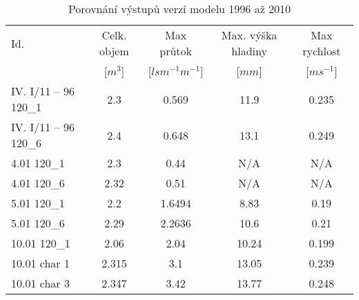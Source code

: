 \begin{table}[htbp]
  \centering
  \caption{Porovnání výstupů verzí modelu 1996 až 2010}
    \begin{tabular}{lcccc}
    \hline   \hline 
      Id.    & Celk. objem & Max průtok & Max. výška hladiny & Max rychlost \\
          & [$m^{3}$]  & [$lsm^{-1}m^{-1}$] & [$mm$]  & [$ms^{-1}$] \\
    \hline
%   
    IV. I/11 – 96 120\_1 & 2.3   & 0.569 & 11.9  & 0.235 \\

    IV. I/11 – 96 120\_6 & 2.4   & 0.648 & 13.1  & 0.249 \\

    4.01 120\_1 & 2.3   & 0.44  &  N/A    &  N/A\\

    4.01 120\_6 & 2.32  & 0.51  &  N/A     &  N/A\\

    5.01 120\_1 & 2.2   & 1.6494 & 8.83  & 0.19 \\

    5.01 120\_6 & 2.29  & 2.2636 & 10.6  & 0.21 \\

    10.01 120\_1 & 2.06  & 2.04  & 10.24 & 0.199 \\

    10.01 char 1 & 2.315 & 3.1   & 13.05 & 0.239 \\

    10.01 char 3 & 2.347 & 3.42  & 13.77 & 0.248 \\
    \hline  \hline 
    \end{tabular}%
  \label{tab:addlabel}%
\end{table} 